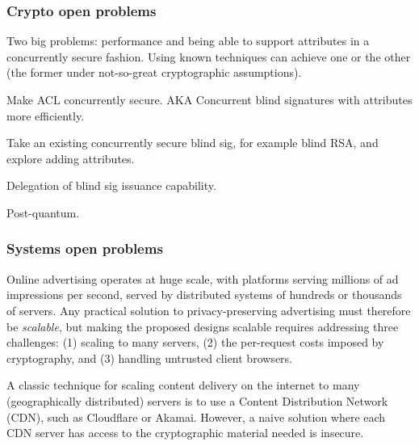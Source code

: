



\subsubsection{Crypto open problems}

Two big problems: performance and being able to support attributes in a concurrently secure fashion.  Using known techniques can achieve one or the other (the former under not-so-great cryptographic assumptions).

Make ACL concurrently secure.  AKA Concurrent blind signatures with attributes more efficiently.

Take an existing concurrently secure blind sig, for example blind RSA, and explore adding attributes.

Delegation of blind sig issuance capability.

Post-quantum.

\subsubsection{Systems open problems}

%
Online advertising operates at huge scale, with platforms serving millions of ad impressions per second, served by distributed systems of hundreds or thousands of servers.
%
Any practical solution to privacy-preserving advertising must therefore be \emph{scalable}, but making the proposed designs scalable requires addressing three challenges: (1) scaling to many servers, (2) the per-request costs imposed by cryptography, and (3) handling untrusted client browsers.
%

%
A classic technique for scaling content delivery on the internet to many (geographically distributed) servers is to use a Content Distribution Network (CDN), such as Cloudflare or Akamai.
%
However, a naive solution where each CDN server has access to the cryptographic material needed is insecure. 
%

